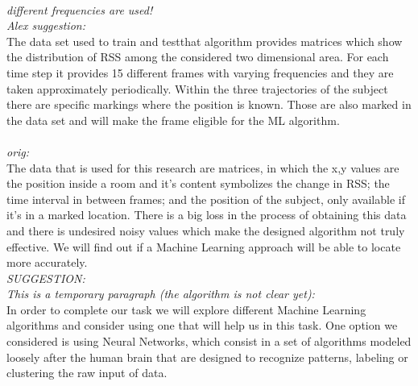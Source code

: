 \documentclass[conference]{IEEEtran}
\begin{document}
\\
\textit{different frequencies are used!}\\
\textit{Alex suggestion:}\\
The data set used to train and testthat algorithm provides matrices which show the distribution of RSS among the considered two dimensional area. For each time step it provides 15 different frames with varying frequencies and they are taken approximately periodically. Within the three trajectories of the subject there are specific markings where the position is known. Those are also marked in the data set and will make the frame eligible for the ML algorithm.  
\\
\\
\textit{orig:}\\
The data that is used for this research are matrices, in which the x,y values are the position inside a room and it's content symbolizes the change in RSS; the time interval in between frames; and the position of the subject, only available if it's in a marked location. There is a big loss in the process of obtaining this data and there is undesired noisy values which make the designed algorithm not truly effective. We will find out if a Machine Learning approach will be able to locate more accurately.\\
\textit{SUGGESTION:}\\
\textit{This is a temporary paragraph (the algorithm is not clear yet):}\\
In order to complete our task we will explore different Machine Learning algorithms and consider using one that will help us in this task. One option we considered is using Neural Networks, which consist in a set of algorithms modeled loosely after the human brain that are designed to recognize patterns, labeling or clustering the raw input of data.

\end{document}
